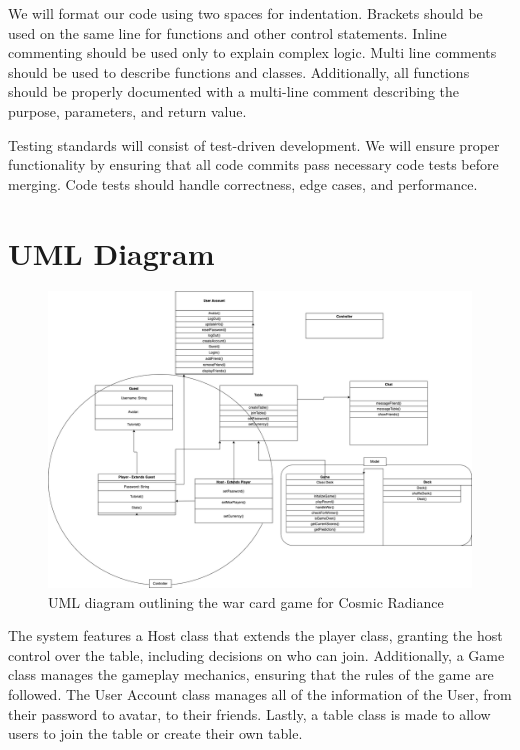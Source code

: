 \documentclass[12pt]{article} %
\begin{document}
We will format our code using two spaces for indentation. Brackets should be used on the same line for functions and other control statements. Inline commenting should be used only to explain complex logic. Multi line comments should be used to describe functions and classes. Additionally, all functions should be properly documented with a multi-line comment describing the purpose, parameters, and return value. 

Testing standards will consist of test-driven development. We will ensure proper functionality by ensuring that all code commits pass necessary code tests before merging. Code tests should handle correctness, edge cases, and performance. 

\section{UML Diagram}
\begin{figure}
    \centering
    \includegraphics[width=1\linewidth]{figures/WarUML.png}
    \caption{UML diagram outlining the war card game for Cosmic Radiance}
    \label{fig:enter-label}
\end{figure}

The system features a Host class that extends the player class, granting the host control over the table, including decisions on who can join. Additionally, a Game class manages the gameplay mechanics, ensuring that the rules of the game are followed. The User Account class manages all of the information of the User, from their password to avatar, to their friends. Lastly, a table class is made to allow users to join the table or create their own table.
\end{document}
